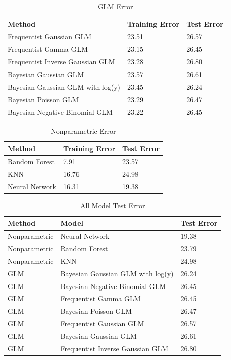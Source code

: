 \documentclass{article}
\begin{document}
\begin{table}[h]
\caption{\label{tab:glmerrorsummary}GLM Error}
\centering
\begin{tabular}{m|m|m}
Method & Training Error & Test Error\\\hline
Frequentist Gaussian GLM & 23.51 & 26.57\\
Frequentist Gamma GLM & 23.15 & 26.45 \\
Frequentist Inverse Gaussian GLM & 23.28 & 26.80\\
Bayesian Gaussian GLM & 23.57 & 26.61\\
Bayesian Gaussian GLM with log(y) & 23.45 & 26.24\\
Bayesian Poisson GLM & 23.29 & 26.47 \\
Bayesian Negative Binomial GLM & 23.22 & 26.45 \\


\end{tabular}
\end{table}

\begin{table}[h]
\caption{\label{tab:nonparamerrorsummary}Nonparametric Error}
\centering
\begin{tabular}{m|m|m}
Method & Training Error & Test Error\\\hline
Random Forest & 7.91 & 23.57 \\
KNN & 16.76 & 24.98\\
Neural Network & 16.31 & 19.38 \\
\end{tabular}
\end{table}

\begin{table}[h]
\caption{\label{tab:allmodeltesterro}All Model Test Error}
\centering
\begin{tabular}{m|m|m}
Method & Model & Test Error \\\hline
Nonparametric & Neural Network & 19.38 \\
Nonparametric & Random Forest & 23.79 \\
Nonparametric & KNN & 24.98 \\
GLM & Bayesian Gaussian GLM with log(y)& 26.24 \\
GLM & Bayesian Negative Binomial GLM & 26.45 \\
GLM & Frequentist Gamma GLM & 26.45 \\
GLM & Bayesian Poisson GLM & 26.47 \\
GLM & Frequentist Gaussian GLM & 26.57  \\
GLM & Bayesian Gaussian GLM & 26.61 \\
GLM & Frequentist Inverse Gaussian GLM & 26.80 \\
\end{tabular}
\end{table}
\end{document}
